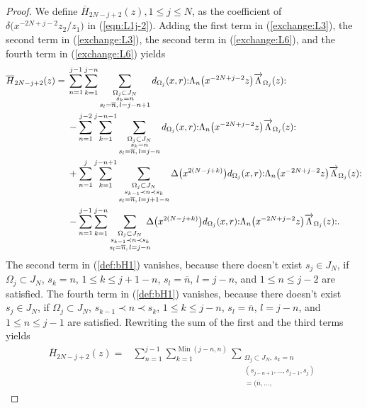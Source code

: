 \documentclass[pdftex]{sigma}
\numberwithin{equation}{section}
\begin{document}
\begin{proof}
We define $\overline{H}_{2N-j+2}(z), 1\leq j \leq N$, as the coefficient of
$\delta\big(x^{-2N+j-2}z_2/z_1\big)$ in (\ref{eqn:L1j-2}).
Adding the first term in (\ref{exchange:L3}),
the second term in (\ref{exchange:L3}), the second term in (\ref{exchange:L6}),
and the fourth term in (\ref{exchange:L6}) yields
\begin{align}
\overline{H}_{2N-j+2}(z)={}&\sum_{n=1}^{j-1}
\sum_{k=1}^{j-n}\sum\limits_{\substack{\Omega_j \subset J_N\\s_k=n
\\s_l=\overline{n},\, l=j-n+1}}
d_{\Omega_j}(x,r) {:}\Lambda_n\big(x^{-2N+j-2}z\big)\overrightarrow{\Lambda}_{\Omega_j}(z){:}\notag
\\
&-\sum_{n=1}^{j-2}\sum_{k=1}^{j-n-1}
\sum\limits_{\substack{\Omega_j \subset J_N\\s_k=n\\s_l=\overline{n},\, l=j-n}}
d_{\Omega_j}(x,r) {:}\Lambda_n\big(x^{-2N+j-2}z\big)
\overrightarrow{\Lambda}_{\Omega_j}(z){:}\notag
\\
&+\sum_{n=1}^{j}\sum_{k=1}^{j-n+1}\sum\limits_{\substack{\Omega_j \subset J_N
\\s_{k-1}\prec n \prec s_k\\s_l=\overline{n},\, l=j+1-n}}
\Delta\big(x^{2(N-j+k)}\big) d_{\Omega_j}(x,r) {:}\Lambda_n\big(x^{-2N+j-2}z\big)\overrightarrow{\Lambda}_{\Omega_j}(z){:}\notag
\\
&-\sum_{n=1}^{j-1}\sum_{k=1}^{j-n}\sum\limits_{\substack{\Omega_j \subset J_N
\\s_{k-1} \prec n \prec s_k\\s_l=\overline{n},\, l=j-n}}\!\!\!\!
\Delta\big(x^{2(N-j+k)}\big) d_{\Omega_j}(x,r){:}\Lambda_n\big(x^{-2N+j-2}z\big)\overrightarrow{\Lambda}_{\Omega_j}(z){:}.
\label{def:bH1}
\end{align}
The second term in (\ref{def:bH1}) vanishes, because there doesn't exist $s_j \in J_N$,
if $\Omega_j \subset J_N$, $s_k=n$, $1\leq k \leq j+1-n$, $s_l=\overline{n}$, $l=j-n$,
and $1\leq n \leq j-2$ are satisfied. The fourth term in (\ref{def:bH1}) vanishes,
because there doesn't exist $s_j \in J_N$,
if $\Omega_j \subset J_N$, $s_{k-1}\prec n \prec s_k$, $1\leq k \leq j-n$, $s_l=\overline{n}$, $l=j-n$, and $1\leq n \leq j-1$ are satisfied. Rewriting the sum of the first and the third terms yields
\begin{align*}
\overline{H}_{2N-j+2}(z)={}&\sum_{n=1}^{j-1}
\sum_{k=1}^{\operatorname{Min}(j-n, n)}
\sum_{\substack{\Omega_j \subset J_N,\,s_k=n\\(s_{j-n+1}, \dots, s_{j-1}, s_j)\\=(\overline{n}, \dots,
}}
\end{align*}
\end{proof}
\end{document}
